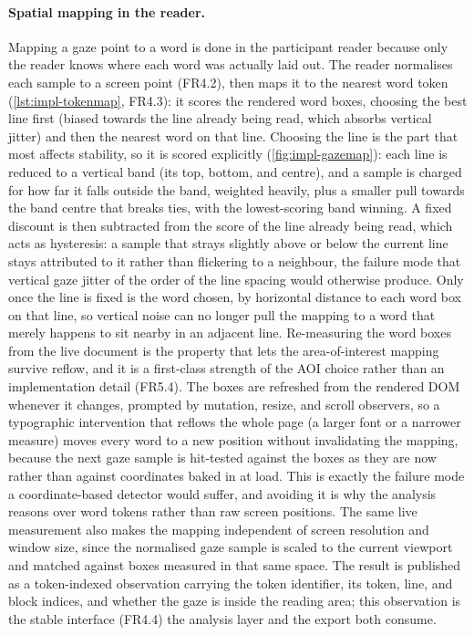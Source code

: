 \paragraph{Spatial mapping in the reader.}
Mapping a gaze point to a word is done in the participant reader because only the reader knows where each word was actually laid out.
The reader normalises each sample to a screen point (FR4.2), then maps it to the nearest word token (\cref{lst:impl-tokenmap}, FR4.3): it scores the rendered word boxes, choosing the best line first (biased towards the line already being read, which absorbs vertical jitter) and then the nearest word on that line.
Choosing the line is the part that most affects stability, so it is scored explicitly (\cref{fig:impl-gazemap}): each line is reduced to a vertical band (its top, bottom, and centre), and a sample is charged for how far it falls outside the band, weighted heavily, plus a smaller pull towards the band centre that breaks ties, with the lowest-scoring band winning.
A fixed discount is then subtracted from the score of the line already being read, which acts as hysteresis: a sample that strays slightly above or below the current line stays attributed to it rather than flickering to a neighbour, the failure mode that vertical gaze jitter of the order of the line spacing would otherwise produce.
Only once the line is fixed is the word chosen, by horizontal distance to each word box on that line, so vertical noise can no longer pull the mapping to a word that merely happens to sit nearby in an adjacent line.
Re-measuring the word boxes from the live document is the property that lets the area-of-interest mapping survive reflow, and it is a first-class strength of the AOI choice rather than an implementation detail (FR5.4).
The boxes are refreshed from the rendered DOM whenever it changes, prompted by mutation, resize, and scroll observers, so a typographic intervention that reflows the whole page (a larger font or a narrower measure) moves every word to a new position without invalidating the mapping, because the next gaze sample is hit-tested against the boxes as they are now rather than against coordinates baked in at load.
This is exactly the failure mode a coordinate-based detector would suffer, and avoiding it is why the analysis reasons over word tokens rather than raw screen positions.
The same live measurement also makes the mapping independent of screen resolution and window size, since the normalised gaze sample is scaled to the current viewport and matched against boxes measured in that same space.
The result is published as a token-indexed observation carrying the token identifier, its token, line, and block indices, and whether the gaze is inside the reading area; this observation is the stable interface (FR4.4) the analysis layer and the export both consume.

